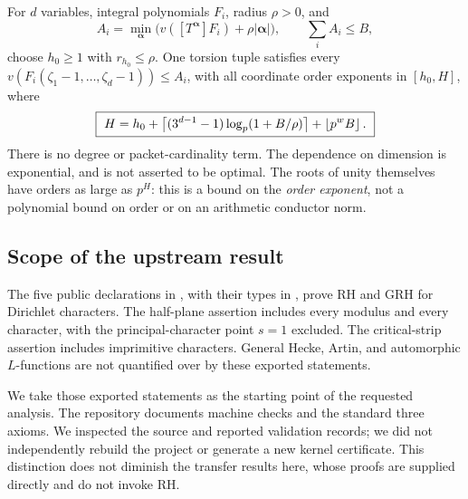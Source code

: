 For $d$ variables, integral polynomials $F_i$, radius $\rho>0$, and
\[
 A_i=\min_{\boldsymbol\alpha}
 \bigl(v([T^{\boldsymbol\alpha}]F_i)+\rho|\boldsymbol\alpha|\bigr),
 \qquad \sum_i A_i\le B,
\]
choose $h_0\ge1$ with $r_{h_0}\le\rho$. One torsion tuple satisfies every
$v(F_i(\zeta_1-1,\ldots,\zeta_d-1))\le A_i$, with all coordinate order exponents in $[h_0,H]$, where
\begin{equation}
\boxed{\ H=h_0+
 \left\lceil (3^{d-1}-1)\log_p(1+B/\rho)\right\rceil
 +\left\lfloor p^w B\right\rfloor.\ }
\label{eq:executive-multi}
\end{equation}
There is no degree or packet-cardinality term. The dependence on dimension is exponential, and is not asserted to be optimal. The roots of unity themselves have orders as large as $p^H$: this is a bound on the \emph{order exponent}, not a polynomial bound on order or on an arithmetic conductor norm.

\subsection{Scope of the upstream result}
The five public declarations in , with their types in , prove RH and GRH for Dirichlet characters. The half-plane assertion includes every modulus and every character, with the principal-character point $s=1$ excluded. The critical-strip assertion includes imprimitive characters. General Hecke, Artin, and automorphic $L$-functions are not quantified over by these exported statements.

We take those exported statements as the starting point of the requested analysis. The repository documents machine checks and the standard three axioms. We inspected the source and reported validation records; we did not independently rebuild the project or generate a new kernel certificate. This distinction does not diminish the transfer results here, whose proofs are supplied directly and do not invoke RH.

